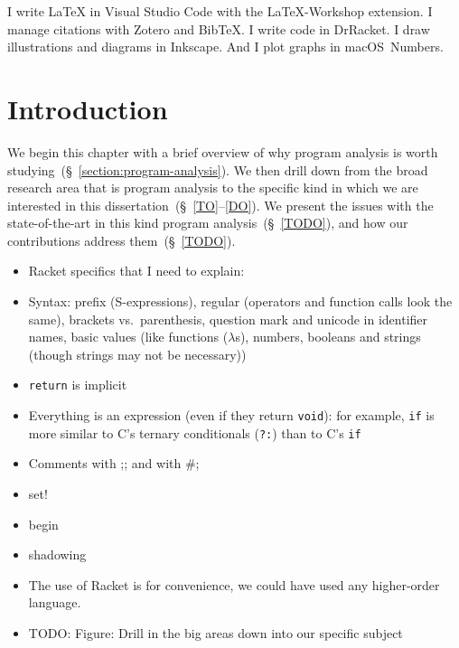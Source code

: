 \documentclass[12pt, oneside]{book}
\begin{document}
I write \LaTeX{} in Visual Studio Code with the LaTeX-Workshop extension. I manage citations with Zotero and Bib\TeX{}. I write code in DrRacket. I draw illustrations and diagrams in Inkscape. And I plot graphs in macOS~Numbers.

\tableofcontents
\listoftables
\listoffigures

\mainmatter

\chapter{Introduction}
\label{section:introduction}

We begin this chapter with a brief overview of why program analysis is worth studying~(§~\ref{section:program-analysis}). We then drill down from the broad research area that is program analysis to the specific kind in which we are interested in this dissertation~(§~\ref{TO}–\ref{DO}). We present the issues with the state-of-the-art in this kind program analysis~(§~\ref{TODO}), and how our contributions address them~(§~\ref{TODO}).

\begin{itemize}
  \item Racket specifics that I need to explain:
  \item Syntax: prefix (S-expressions), regular (operators and function calls look the same), brackets vs.\ parenthesis, question mark and unicode in identifier names, basic values (like functions (\(λ\)s), numbers, booleans and strings (though strings may not be necessary))
  \item \texttt{return} is implicit
  \item Everything is an expression (even if they return \texttt{void}): for example, \texttt{if} is more similar to C’s ternary conditionals (\texttt{?:}) than to C’s \texttt{if}
  \item Comments with ;; and with \#;
  \item set!
  \item begin
  \item shadowing
  \item The use of Racket is for convenience, we could have used any higher-order language.
\end{itemize}

\begin{itemize}
  \item TODO: Figure: Drill in the big areas down into our specific subject
\end{itemize}
\end{document}
